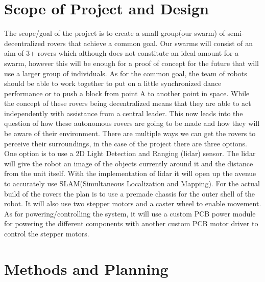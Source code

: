 \documentclass[conference]{IEEEtran}
\begin{document}
\section{Scope of Project and Design}The scope/goal of the project is to create a small group(our swarm) of semi-decentralized rovers that achieve a common goal. Our swarms will consist of an aim of 3+ rovers which although does not constitute an ideal amount for a swarm, however this will be enough for a proof of concept for the future that will use a larger group of individuals. As for the common goal, the team of robots should be able to work together to put on a little synchronized dance performance or to push a block from point A to another point in space. While the concept of these rovers being decentralized means that they are able to act independently with assistance from a central leader. This now leads into the question of how these autonomous rovers are going to be made and how they will be aware of their environment.
There are multiple ways we can get the rovers to perceive their surroundings, in the case of the project there are three options. One option is to use a 2D Light Detection and Ranging (lidar) sensor. The lidar will give the robot an image of the objects currently around it and the distance from the unit itself. With the implementation of lidar it will open up the avenue to accurately use SLAM(Simultaneous Localization and Mapping). For the actual build of the rovers the plan is to use a premade chassis for the outer shell of the robot. It will also use two stepper motors and a caster wheel to enable movement. As for powering/controlling the system, it will use a custom PCB power module for powering the different components with another custom PCB motor driver to control the stepper motors.

\section{Methods and Planning}
\end{document}
